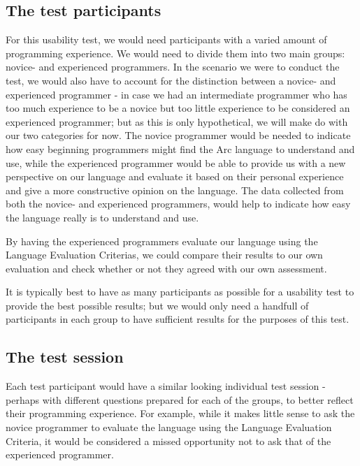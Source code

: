 \subsection{The test participants}\label{subsubsec:theTestParticipants}

For this usability test, we would need participants with a varied amount of programming experience. We would need to divide them into two main groups: novice- and experienced programmers. In the scenario we were to conduct the test, we would also have to account for the distinction between a novice- and experienced programmer - in case we had an intermediate programmer who has too much experience to be a novice but too little experience to be considered an experienced programmer; but as this is only hypothetical, we will make do with our two categories for now. The novice programmer would be needed to indicate how easy beginning programmers might find the Arc language to understand and use, while the experienced programmer would be able to provide us with a new perspective on our language and evaluate it based on their personal experience and give a more constructive opinion on the language. The data collected from both the novice- and experienced programmers, would help to indicate how easy the language really is to understand and use.

By having the experienced programmers evaluate our language using the Language Evaluation Criterias, we could compare their results to our own evaluation and check whether or not they agreed with our own assessment.

It is typically best to have as many participants as possible for a usability test to provide the best possible results; but we would only need a handfull of participants in each group to have sufficient results for the purposes of this test.

\subsection{The test session}\label{subsubsec:theTestSession}

Each test participant would have a similar looking individual test session - perhaps with different questions prepared for each of the groups, to better reflect their programming experience. For example, while it makes little sense to ask the novice programmer to evaluate the language using the Language Evaluation Criteria, it would be considered a missed opportunity not to ask that of the experienced programmer.

